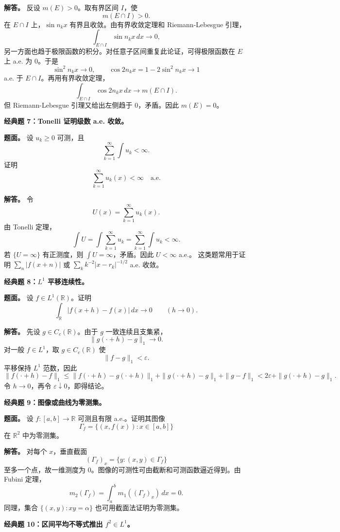 \documentclass[
UTF8]{ctexart}
\newcommand{\impA}{\hspace{0.4em}{\small\textcolor{impAColor}{\textbf{[A 核心]}}}}
\newcommand{\impB}{\hspace{0.4em}{\small\textcolor{impBColor}{\textbf{[B 重要]}}}}
\begin{document}
\textbf{解答。} 反设 \(m(E)>0\)。取有界区间 \(I\)，使
\[
  m(E\cap I)>0.
\]
在 \(E\cap I\) 上，\(\sin n_kx\) 有界且收敛。由有界收敛定理和 Riemann-Lebesgue 引理，
\[
  \int_{E\cap I}\sin n_kx\,dx\to0,
\]
另一方面也趋于极限函数的积分。对任意子区间重复此论证，可得极限函数在 \(E\) 上 a.e. 为
\(0\)。于是
\[
  \sin^2 n_kx\to0,\qquad \cos 2n_kx=1-2\sin^2 n_kx\to1
\]
a.e. 于 \(E\cap I\)。再用有界收敛定理，
\[
  \int_{E\cap I}\cos 2n_kx\,dx\to m(E\cap I).
\]
但 Riemann-Lebesgue 引理又给出左侧趋于 \(0\)，矛盾。因此 \(m(E)=0\)。

\textbf{经典题 7：Tonelli 证明级数 a.e. 收敛。}\impA

\textbf{题面。} 设 \(u_k\ge0\) 可测，且
\[
  \sum_{k=1}^{\infty}\int u_k<\infty.
\]
证明
\[
  \sum_{k=1}^{\infty}u_k(x)<\infty
  \quad\text{a.e.}
\]

\textbf{解答。} 令
\[
  U(x)=\sum_{k=1}^{\infty}u_k(x).
\]
由 Tonelli 定理，
\[
  \int U=\int\sum_{k=1}^{\infty}u_k
  =\sum_{k=1}^{\infty}\int u_k<\infty.
\]
若 \(\{U=\infty\}\) 有正测度，则 \(\int U=\infty\)，矛盾。因此 \(U<\infty\) a.e.。
这类题常用于证明
\(\sum_n |f(x+n)|\) 或 \(\sum_k k^{-2}|x-r_k|^{-1/2}\) a.e. 收敛。

\textbf{经典题 8：\(L^1\) 平移连续性。}\impA

\textbf{题面。} 设 \(f\in L^1(\mathbb R)\)。证明
\[
  \int_{\mathbb R}|f(x+h)-f(x)|\,dx\to0
  \qquad (h\to0).
\]

\textbf{解答。} 先设 \(g\in C_c(\mathbb R)\)。由于 \(g\) 一致连续且支集紧，
\[
  \|g(\cdot+h)-g\|_1\to0.
\]
对一般 \(f\in L^1\)，取 \(g\in C_c(\mathbb R)\) 使
\[
  \|f-g\|_1<\varepsilon.
\]
平移保持 \(L^1\) 范数，因此
\[
  \|f(\cdot+h)-f\|_1
  \le \|f(\cdot+h)-g(\cdot+h)\|_1
  +\|g(\cdot+h)-g\|_1+\|g-f\|_1
  <2\varepsilon+\|g(\cdot+h)-g\|_1.
\]
令 \(h\to0\)，再令 \(\varepsilon\downarrow0\)，即得结论。

\textbf{经典题 9：图像或曲线为零测集。}\impB

\textbf{题面。} 设 \(f:[a,b]\to\mathbb R\) 可测且有限 a.e.。证明其图像
\[
  \Gamma_f=\{(x,f(x)):x\in[a,b]\}
\]
在 \(\mathbb R^2\) 中为零测集。

\textbf{解答。} 对每个 \(x\)，垂直截面
\[
  (\Gamma_f)_x=\{y:(x,y)\in\Gamma_f\}
\]
至多一个点，故一维测度为 \(0\)。图像的可测性可由截断和可测函数逼近得到。由 Fubini 定理，
\[
  m_2(\Gamma_f)=\int_a^b m_1((\Gamma_f)_x)\,dx=0.
\]
同理，集合 \(\{(x,y):xy=\alpha\}\) 也可用截面法证明为零测集。

\textbf{经典题 10：区间平均不等式推出 \(f^2\in L^1\)。}\impA
\end{document}
